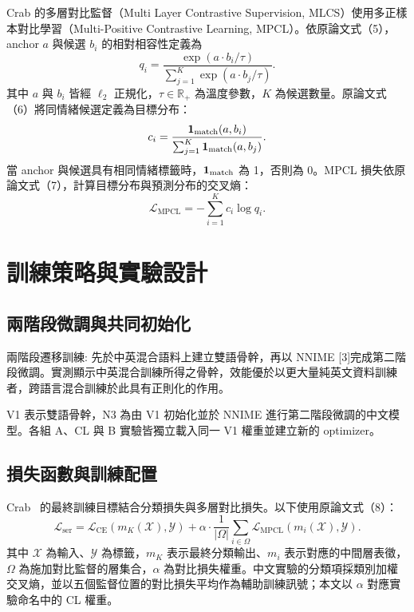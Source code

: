 Crab 的多層對比監督（Multi Layer Contrastive Supervision, MLCS）使用多正樣本對比學習（Multi-Positive Contrastive Learning, MPCL）。依原論文式（5），anchor $a$ 與候選 $b_i$ 的相對相容性定義為
\begin{equation}
 q_i=\frac{\exp(a\cdot b_i/\tau)}
 {\sum_{j=1}^{K}\exp(a\cdot b_j/\tau)}.
 \label{eq:paper_mpcl_q}
\end{equation}
其中 $a$ 與 $b_i$ 皆經 $\ell_2$ 正規化，$\tau\in\mathbb R_+$ 為溫度參數，$K$ 為候選數量。原論文式（6）將同情緒候選定義為目標分布：
\begin{equation}
 c_i=\frac{\mathbf{1}_{\mathrm{match}}(a,b_i)}
 {\sum_{j=1}^{K}\mathbf{1}_{\mathrm{match}}(a,b_j)}.
 \label{eq:paper_mpcl_c}
\end{equation}
當 anchor 與候選具有相同情緒標籤時，$\mathbf{1}_{\mathrm{match}}$ 為 1，否則為 0。MPCL 損失依原論文式（7），計算目標分布與預測分布的交叉熵：
\begin{equation}
 \mathcal L_{\mathrm{MPCL}}=-\sum_{i=1}^{K}c_i\log q_i.
 \label{eq:paper_mpcl}
\end{equation}

\FloatBarrier

\section{訓練策略與實驗設計}

\subsection{兩階段微調與共同初始化}
兩階段遷移訓練: 先於中英混合語料上建立雙語骨幹，再以 NNIME [3]完成第二階段微調。實測顯示中英混合訓練所得之骨幹，效能優於以更大量純英文資料訓練者，跨語言混合訓練於此具有正則化的作用。

V1 表示雙語骨幹，N3 為由 V1 初始化並於 NNIME 進行第二階段微調的中文模型。各組 A、CL 與 B 實驗皆獨立載入同一 V1 權重並建立新的 optimizer。


\subsection{損失函數與訓練配置}
Crab~\cite{crab} 的最終訓練目標結合分類損失與多層對比損失。以下使用原論文式（8）：
\begin{equation}
 \mathcal L_{\mathrm{ser}}
 =\mathcal L_{\mathrm{CE}}\!\left(m_K(\mathcal X),\mathcal Y\right)
 +\alpha\cdot\frac{1}{|\Omega|}
 \sum_{i\in\Omega}\mathcal L_{\mathrm{MPCL}}
 \!\left(m_i(\mathcal X),\mathcal Y\right).
 \label{eq:paper_mlcs}
\end{equation}
其中 $\mathcal X$ 為輸入、$\mathcal Y$ 為標籤，$m_K$ 表示最終分類輸出、$m_i$ 表示對應的中間層表徵，$\Omega$ 為施加對比監督的層集合，$\alpha$ 為對比損失權重。中文實驗的分類項採類別加權交叉熵，並以五個監督位置的對比損失平均作為輔助訓練訊號；本文以 $\alpha$ 對應實驗命名中的 CL 權重。

